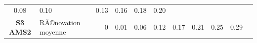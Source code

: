 \documentclass[]{article}
\begin{document}
\begin{longtable}[]{@{}clrrrrrrrrr@{}}
\begin{minipage}[t]{0.05\columnwidth}
0.08\strut
\end{minipage} & \begin{minipage}[t]{0.05\columnwidth}\raggedleft\strut
0.10\strut
\end{minipage} & \begin{minipage}[t]{0.05\columnwidth}\raggedleft\strut
0.13\strut
\end{minipage} & \begin{minipage}[t]{0.05\columnwidth}\raggedleft\strut
0.16\strut
\end{minipage} & \begin{minipage}[t]{0.05\columnwidth}\raggedleft\strut
0.18\strut
\end{minipage} & \begin{minipage}[t]{0.05\columnwidth}\raggedleft\strut
0.20\strut
\end{minipage}\tabularnewline
\begin{minipage}[t]{0.12\columnwidth}\centering\strut
\textbf{S3 AMS2}\strut
\end{minipage} & \begin{minipage}[t]{0.17\columnwidth}\raggedright\strut
RÃ©novation moyenne\strut
\end{minipage} & \begin{minipage}[t]{0.05\columnwidth}\raggedleft\strut
0\strut
\end{minipage} & \begin{minipage}[t]{0.05\columnwidth}\raggedleft\strut
0.01\strut
\end{minipage} & \begin{minipage}[t]{0.05\columnwidth}\raggedleft\strut
0.06\strut
\end{minipage} & \begin{minipage}[t]{0.05\columnwidth}\raggedleft\strut
0.12\strut
\end{minipage} & \begin{minipage}[t]{0.05\columnwidth}\raggedleft\strut
0.17\strut
\end{minipage} & \begin{minipage}[t]{0.05\columnwidth}\raggedleft\strut
0.21\strut
\end{minipage} & \begin{minipage}[t]{0.05\columnwidth}\raggedleft\strut
0.25\strut
\end{minipage} & \begin{minipage}[t]{0.05\columnwidth}\raggedleft\strut
0.29\strut
\end{minipage} & \begin{minipage}[t]{0.05\columnwidth}\raggedleft\strut

\end{minipage}
\end{longtable}
\end{document}
